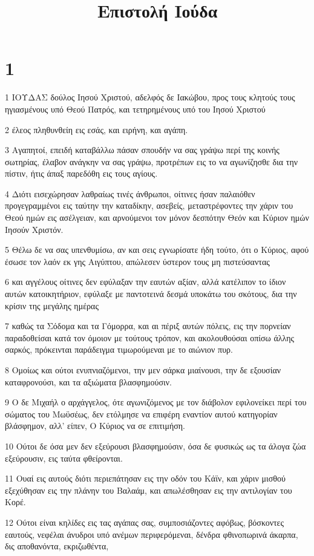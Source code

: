

\title{Επιστολή Ιούδα}


\chapter{1}

\par 1 ΙΟΥΔΑΣ δούλος Ιησού Χριστού, αδελφός δε Ιακώβου, προς τους κλητούς τους ηγιασμένους υπό Θεού Πατρός, και τετηρημένους υπό του Ιησού Χριστού
\par 2 έλεος πληθυνθείη εις εσάς, και ειρήνη, και αγάπη.
\par 3 Αγαπητοί, επειδή καταβάλλω πάσαν σπουδήν να σας γράψω περί της κοινής σωτηρίας, έλαβον ανάγκην να σας γράψω, προτρέπων εις το να αγωνίζησθε δια την πίστιν, ήτις άπαξ παρεδόθη εις τους αγίους.
\par 4 Διότι εισεχώρησαν λαθραίως τινές άνθρωποι, οίτινες ήσαν παλαιόθεν προγεγραμμένοι εις ταύτην την καταδίκην, ασεβείς, μεταστρέφοντες την χάριν του Θεού ημών εις ασέλγειαν, και αρνούμενοι τον μόνον δεσπότην Θεόν και Κύριον ημών Ιησούν Χριστόν.
\par 5 Θέλω δε να σας υπενθυμίσω, αν και σεις εγνωρίσατε ήδη τούτο, ότι ο Κύριος, αφού έσωσε τον λαόν εκ γης Αιγύπτου, απώλεσεν ύστερον τους μη πιστεύσαντας
\par 6 και αγγέλους οίτινες δεν εφύλαξαν την εαυτών αξίαν, αλλά κατέλιπον το ίδιον αυτών κατοικητήριον, εφύλαξε με παντοτεινά δεσμά υποκάτω του σκότους, δια την κρίσιν της μεγάλης ημέρας
\par 7 καθώς τα Σόδομα και τα Γόμορρα, και αι πέριξ αυτών πόλεις, εις την πορνείαν παραδοθείσαι κατά τον όμοιον με τούτους τρόπον, και ακολουθούσαι οπίσω άλλης σαρκός, πρόκεινται παράδειγμα τιμωρούμεναι με το αιώνιον πυρ.
\par 8 Ομοίως και ούτοι ενυπνιαζόμενοι, την μεν σάρκα μιαίνουσι, την δε εξουσίαν καταφρονούσι, και τα αξιώματα βλασφημούσιν.
\par 9 Ο δε Μιχαήλ ο αρχάγγελος, ότε αγωνιζόμενος με τον διάβολον εφιλονείκει περί του σώματος του Μωϋσέως, δεν ετόλμησε να επιφέρη εναντίον αυτού κατηγορίαν βλάσφημον, αλλ' είπεν, Ο Κύριος να σε επιτιμήση.
\par 10 Ούτοι δε όσα μεν δεν εξεύρουσι βλασφημούσιν, όσα δε φυσικώς ως τα άλογα ζώα εξεύρουσιν, εις ταύτα φθείρονται.
\par 11 Ουαί εις αυτούς διότι περιεπάτησαν εις την οδόν του Κάϊν, και χάριν μισθού εξεχύθησαν εις την πλάνην του Βαλαάμ, και απωλέσθησαν εις την αντιλογίαν του Κορέ.
\par 12 Ούτοι είναι κηλίδες εις τας αγάπας σας, συμποσιάζοντες αφόβως, βόσκοντες εαυτούς, νεφέλαι άνυδροι υπό ανέμων περιφερόμεναι, δένδρα φθινοπωρινά άκαρπα, δις αποθανόντα, εκριζωθέντα,
